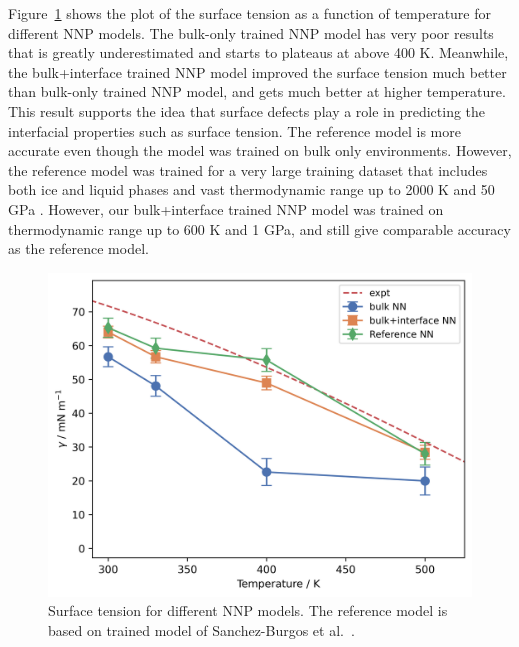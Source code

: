 Figure~\ref{fig:surf_tens} shows the plot of the surface
tension as a function of temperature for different NNP models. The bulk-only
trained NNP model has very poor results that is greatly underestimated and
starts to plateaus at above 400 K. Meanwhile, the bulk+interface trained NNP
model
improved the surface
tension much better than  bulk-only trained NNP model, and gets much better at
higher
temperature. This result supports the idea that surface defects play a role in
predicting
the interfacial properties such as surface tension. The reference
model is more accurate even though the model was trained on  bulk only
environments. However, the reference model was trained for a very large
training dataset that includes both ice and liquid phases and vast
thermodynamic range up to 2000 K and 50 GPa \cite{zhang2021phase}. However, our
bulk+interface trained NNP model was trained on thermodynamic range up to 600 K
and 1 GPa, and still give comparable accuracy as the reference model.

\begin{figure}[h!]
	\centering
	\includegraphics[width=0.7\linewidth]{images/surface_tension.png}
	\caption{Surface tension for different NNP models. The
		reference model is based on trained model of Sanchez-Burgos et
		al.~\cite{sanchez2023deep}.  }
	\label{fig:surf_tens}
\end{figure}

